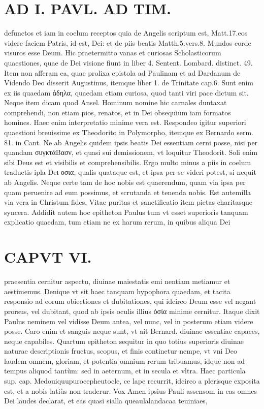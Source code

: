 \documentclass{article}
\begin{document}
\begin{pages}
\section*{AD I. PAVL. AD TIM. }
\marginpar{[ p.492 ]}\pstart defunctos et iam in coelum receptos quia de Angelis scriptum est, Matt.17.eos videre faciem Patris, id est, Dei: et de piis beatis Matth.5.vers.8. Mundos corde visuros esse Deum. Hic praetermitto vanas et curiosas Scholasticorum quaestiones, quae de Dei visione fiunt in liber 4. Sentent. Lombard. distinct. 49. Item non afferam ea, quae prolixa epistola ad Paulinam et ad Dardanum de Videndo Deo disserit Augustinus, itemque liber 1. de Trinitate cap.6. Sunt enim ex iis quaedam ἀδηλα, quaedam etiam curiosa, quod tanti viri pace dictum sit. Neque item dicam quod Ansel. Hominum nomine hic carnales duntaxat comprehendi, non etiam pios, renatos, et in Dei obsequium iam formatos homines. Haec enim interpretatio minime vera est. Respondeo igitur superiori quaestioni breuissime ex Theodorito in Polymorpho, itemque ex Bernardo serm. 81. in Cant. Ne ab Angelis quidem ipsis beatis Dei essentiam cerni posse, nisi per quandam συγκτάΒασν, et quasi sui demissionem, vt loquitur Theodorit. Soli enim sibi Deus est et visibilis et comprehensibilis. Ergo multo minus a piis in coelum traductis ipla Deι οσια, qualis quataque est, et ipsa per se videri potest, si nequit ab Angelis. Neque certe tam de hoc nobis est quaerendum, quam via ipsa per quam peruenire ad eum possimus, et scrutanda et tenenda nobis. Est autemilla via vera in Christum fides, Vitae puritas et sanctificatio item pietas charitasque syncera.  \pend\pstart Addidit autem hoc epitheton Paulus tum vt esset superioris tanquam explicatio quaedam, tum etiam ne ex harum rerum, in quibus aliqua Dei  \pend
\section*{CAPVT VI. }
\marginpar{[ p.493 ]}\pstart praesentia cernitur aspectu, diuinae maiestatis emi nentiam metiamur et aestimemus. Denique vt sit haec tanquam hypophora quaedam, et tacita responsio ad eorum obiectiones et dubitationes, qui idcirco Deum esse vel negant prorsus, vel dubitant, quod ab ipsis oculis illius ὀσία minime cernitur. Itaque dixit Paulus neminem vel vidisse Deum antea, vel nunc, vel in posterum etiam videre posse. Caro enim et sanguis neque sunt, vt ait Bernard. diuinae essentiae capaces, neque capabiles.  \pend\pstart Quartum epitheton sequitur in quo totius superioris diuinae naturae descriptionis fructus, scopus, et finis continetur nempe, vt vni Deo laudem omnem, gloriam, et potentia omnium rerum tribuamus, idque  non ad tempus aliquod tantùm: sed in aeternum, et in secula et vltra. Haec particula sup. cap. Medouiquupurocepheutocle, ce lape recurrit, idcirco a plerisque exposita est, et a nobis latiùs non traderur. Vox Amen ipsius Pauli assensom in eas omnes Dei laudes declarat, et eas quasi sialla queaulalandacaa teuiniaes,  \pend
{}
{}

\end{pages}
\end{document}
